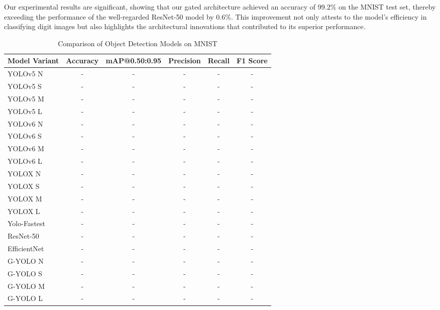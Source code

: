 Our experimental results are significant, showing that our gated architecture achieved an accuracy of 99.2\% on the MNIST test set, thereby exceeding the performance of the well-regarded ResNet-50 model by 0.6\%. This improvement not only attests to the model's efficiency in classifying digit images but also highlights the architectural innovations that contributed to its superior performance.

\begin{table}[htbp]
    \centering
    \caption{Comparison of Object Detection Models on MNIST}
    \label{tab:mnist_model_comparison}
    \begin{tabularx}{\textwidth}{@{}Xccccc@{}}
    \toprule
    Model Variant & Accuracy & mAP@0.50:0.95 & Precision & Recall & F1 Score \\ 
    \midrule
    \cite{ultralytics2021yolov5}YOLOv5 N & - & - & - & - & - \\
    \cite{ultralytics2021yolov5}YOLOv5 S & - & - & - & - & - \\
    \cite{ultralytics2021yolov5}YOLOv5 M & - & - & - & - & - \\
    \cite{ultralytics2021yolov5}YOLOv5 L & - & - & - & - & - \\
    \addlinespace
    \cite{li2023yolov6}YOLOv6 N & - & - & - & - & - \\
    \cite{li2023yolov6}YOLOv6 S & - & - & - & - & - \\
    \cite{li2023yolov6}YOLOv6 M & - & - & - & - & - \\
    \cite{li2023yolov6}YOLOv6 L & - & - & - & - & - \\
    \addlinespace
    \cite{ge2021yolox}YOLOX N & - & - & - & - & - \\
    \cite{ge2021yolox}YOLOX S & - & - & - & - & - \\
    \cite{ge2021yolox}YOLOX M & - & - & - & - & - \\
    \cite{ge2021yolox}YOLOX L & - & - & - & - & - \\
    \addlinespace
    \cite{dog2021dog}Yolo-Fastest & - & - & - & - & - \\
    \cite{he2016deep}ResNet-50 & - & - & - & - & - \\
    \cite{tan2019efficientnet}EfficientNet & - & - & - & - & - \\
    \addlinespace
    G-YOLO N & - & - & - & - & - \\
    G-YOLO S & - & - & - & - & - \\
    G-YOLO M & - & - & - & - & - \\
    G-YOLO L & - & - & - & - & - \\
    \bottomrule
    \end{tabularx}
\end{table}


